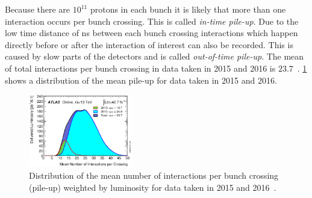 Because there are $10^{11}$ protons in each bunch it is likely that more than one interaction occurs per bunch crossing.
This is called \emph{in-time pile-up}.
Due to the low time distance of \unit[25]{ns} between each bunch crossing interactions which happen directly before or after
the interaction of interest can also be recorded.
This is caused by slow parts of the detectors and is called \emph{out-of-time pile-up}.
The mean of total interactions per bunch crossing in data taken in 2015 and 2016 is $23.7$~\cite{PublicLumiRun2}.
\cref{fig:setup:pileup} shows a distribution of the mean pile-up for data taken in 2015 and 2016.

\begin{figure}[htb]
    \centering
    \includegraphics[width=0.4\textwidth]{./figures/setup/pileup_2015_2016.eps}
    \caption{Distribution of the mean number of interactions per bunch crossing (pile-up)
             weighted by luminosity for data taken in 2015 and 2016~\cite{PublicLumiRun2}.}\label{fig:setup:pileup}
\end{figure}
